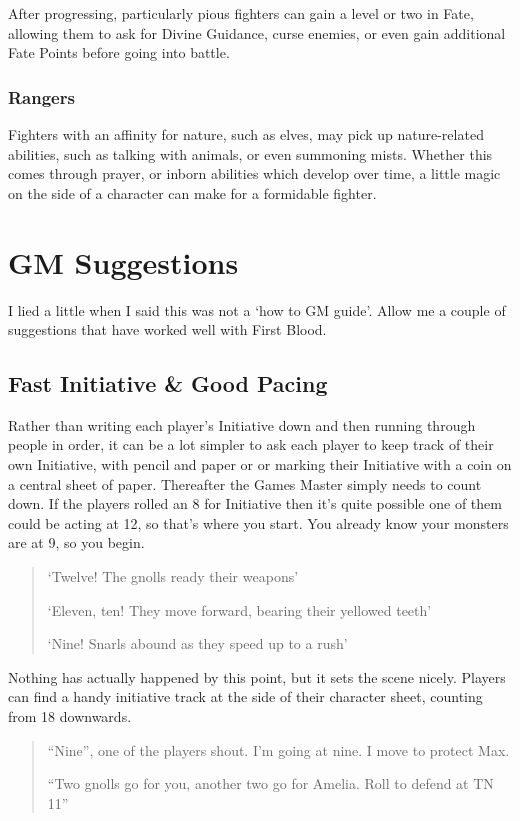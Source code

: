 After progressing, particularly pious fighters can gain a level or two in Fate, allowing them to ask for Divine Guidance, curse enemies, or even gain additional Fate Points before going into battle.

\subsubsection{Rangers}

Fighters with an affinity for nature, such as elves, may pick up nature-related abilities, such as talking with animals, or even summoning mists.  Whether this comes through prayer, or inborn abilities which develop over time, a little magic on the side of a character can make for a formidable fighter.


\section{GM Suggestions}
I lied a little when I said this was not a `how to GM guide'.  Allow me a couple of suggestions that have worked well with First Blood.

\subsection{Fast Initiative \& Good Pacing}

Rather than writing each player's Initiative down and then running through people in order, it can be a lot simpler to ask each player to keep track of their own Initiative, with pencil and paper or or marking their Initiative with a coin on a central sheet of paper. Thereafter the Games Master simply needs to count down. If the players rolled an 8 for Initiative then it's quite possible one of them could be acting at 12, so that's where you start. You already know your monsters are at 9, so you begin.

\begin{quote}
`Twelve! The gnolls ready their weapons'

`Eleven, ten! They move forward, bearing their yellowed teeth'

`Nine! Snarls abound as they speed up to a rush'
\end{quote}

Nothing has actually happened by this point, but it sets the scene nicely.  Players can find a handy initiative track at the side of their character sheet, counting from 18 downwards.

\begin{quote}
``Nine'', one of the players shout.  I'm going at nine.  I move to protect Max.

``Two gnolls go for you, another two go for Amelia.  Roll to defend at TN 11''

\end{quote}


